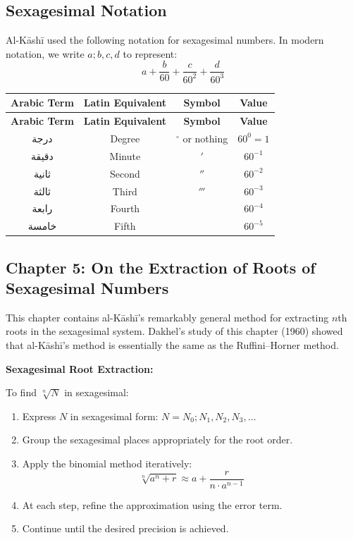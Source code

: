 \documentclass[11pt,a4paper]{article}
\newenvironment{mathalgo}{%
  \par\vspace{0.3cm}
  \begin{framed}
  \setlength{\parindent}{0pt}
}{%
  \end{framed}
  \par\vspace{0.3cm}
}
\newcommand{\ar}[1]{{\arabicfont\beginR #1\endR}}
\begin{document}
\subsection{Sexagesimal Notation}

Al-K\=ash\=i used the following notation for sexagesimal numbers. In modern
notation, we write $a; b, c, d$ to represent:
\[
a + \frac{b}{60} + \frac{c}{60^2} + \frac{d}{60^3}
\]

\begin{longtable}{|c|c|c|c|}
\hline
\textbf{Arabic Term} & \textbf{Latin Equivalent} & \textbf{Symbol} &
\textbf{Value} \\
\hline
\endfirsthead
\hline
\textbf{Arabic Term} & \textbf{Latin Equivalent} & \textbf{Symbol} &
\textbf{Value} \\
\hline
\endhead
\ar{درجة} & Degree & $^\circ$ or nothing & $60^0 = 1$ \\
\hline
\ar{دقيقة} & Minute & $'$ & $60^{-1}$ \\
\hline
\ar{ثانية} & Second & $''$ & $60^{-2}$ \\
\hline
\ar{ثالثة} & Third & $'''$ & $60^{-3}$ \\
\hline
\ar{رابعة} & Fourth & & $60^{-4}$ \\
\hline
\ar{خامسة} & Fifth & & $60^{-5}$ \\
\hline
\end{longtable}

\subsection{Chapter 5: On the Extraction of Roots of Sexagesimal Numbers}

This chapter contains al-K\=ash\=i's remarkably general method for
extracting $n$th roots in the sexagesimal system. Dakhel's study of
this chapter (1960) showed that al-K\=ash\=i's method is essentially the
same as the Ruffini--Horner method.

\begin{mathalgo}
\textbf{Sexagesimal Root Extraction:}

To find $\sqrt[n]{N}$ in sexagesimal:
\begin{enumerate}[nosep]
  \item Express $N$ in sexagesimal form: $N = N_0; N_1, N_2, N_3, \ldots$
  \item Group the sexagesimal places appropriately for the root order.
  \item Apply the binomial method iteratively:
    \[
    \sqrt[n]{a^n + r} \approx a + \frac{r}{n \cdot a^{n-1}}
    \]
  \item At each step, refine the approximation using the error term.
  \item Continue until the desired precision is achieved.
\end{enumerate}
\end{mathalgo}
\end{document}
